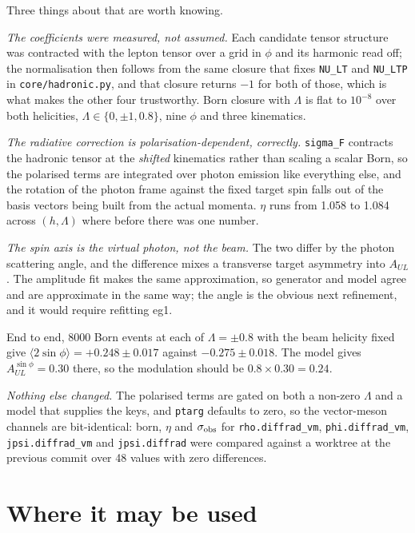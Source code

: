 \documentclass[11pt,a4paper]{article}
\newcommand{\code}[1]{\texttt{#1}}
\begin{document}
Three things about that are worth knowing.

\emph{The coefficients were measured, not assumed.}  Each candidate tensor
structure was contracted with the lepton tensor over a grid in $\phi$ and its
harmonic read off; the normalisation then follows from the same closure that
fixes \code{NU\_LT} and \code{NU\_LTP} in \code{core/hadronic.py}, and that
closure returns $-1$ for both of those, which is what makes the other four
trustworthy.  Born closure with $\Lambda$ is flat to $10^{-8}$ over both
helicities, $\Lambda \in \{0, \pm 1, 0.8\}$, nine $\phi$ and three kinematics.

\emph{The radiative correction is polarisation-dependent, correctly.}
\code{sigma\_F} contracts the hadronic tensor at the \emph{shifted} kinematics
rather than scaling a scalar Born, so the polarised terms are integrated over
photon emission like everything else, and the rotation of the photon frame
against the fixed target spin falls out of the basis vectors being built from
the actual momenta.  $\eta$ runs from 1.058 to 1.084 across $(h, \Lambda)$
where before there was one number.

\emph{The spin axis is the virtual photon, not the beam.}  The two differ by
the photon scattering angle, and the difference mixes a transverse target
asymmetry into $A_{UL}$.  The amplitude fit makes the same approximation, so
generator and model agree and are approximate in the same way; the angle is
the obvious next refinement, and it would require refitting eg1.

End to end, 8000 Born events at each of $\Lambda = \pm 0.8$ with the beam
helicity fixed give $\langle 2\sin\phi\rangle = +0.248 \pm 0.017$ against
$-0.275 \pm 0.018$.  The model gives $A_{UL}^{\sin\phi} = 0.30$ there, so the
modulation should be $0.8 \times 0.30 = 0.24$.

\emph{Nothing else changed.}  The polarised terms are gated on both a non-zero
$\Lambda$ and a model that supplies the keys, and \code{ptarg} defaults to
zero, so the vector-meson channels are bit-identical: born, $\eta$ and
$\sigma_{\rm obs}$ for \code{rho.diffrad\_vm}, \code{phi.diffrad\_vm},
\code{jpsi.diffrad\_vm} and \code{jpsi.diffrad} were compared against a
worktree at the previous commit over 48 values with zero differences.

\section{Where it may be used}
\end{document}
